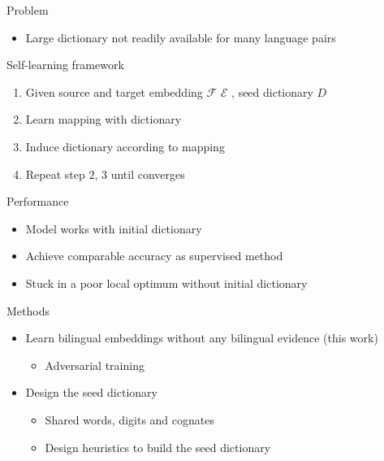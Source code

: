 \documentclass[11pt, a4paper, landscape]{article}
\begin{document}
	\NewPage
	\vfill
	Problem
	\begin{itemize}
		\item Large dictionary not readily available for many language pairs\\
	\end{itemize}
	Self-learning framework
	\begin{enumerate}
		\item Given source and target embedding ${\mathcal{F}}$ ${\mathcal{E}}$ , seed dictionary $D$
		\item Learn mapping with dictionary
		\item Induce dictionary according to mapping
		\item Repeat step $2$, $3$ until converges\\
	\end{enumerate}
	
	Performance
	\begin{itemize}
		\item Model works with initial dictionary		
		\item Achieve comparable accuracy as supervised method
		\item Stuck in a poor local optimum without initial dictionary
	\end{itemize}
	
	\vfill
	
	\NewPage
	\vfill

		
	
	Methods
	\begin{itemize}
		\item 	Learn bilingual embeddings without any bilingual evidence (this work)
		\begin{itemize}
			\item Adversarial training	\cite{conneau2017word}
		\end{itemize}
		\item Design the seed dictionary
		\begin{itemize}
			\item Shared words, digits and cognates \cite{artetxe2017learning}
			\item Design heuristics to 
			build the seed dictionary \\ \cite{hoshen2018iterative} \cite{artetxe2018robust}
		\end{itemize}
		
	\end{itemize}
	\vfill
	
\end{document}
